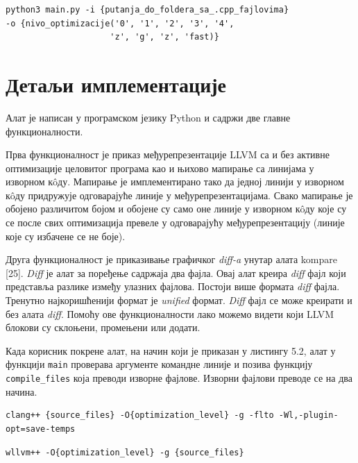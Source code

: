 \documentclass[12pt,oneside]{memoir}
\begin{document}
\begin{lstlisting}[frame=single,caption=Шаблон покретања алата,captionpos=b]
python3 main.py -i {putanja_do_foldera_sa_.cpp_fajlovima}
-o {nivo_optimizacije('0', '1', '2', '3', '4',
                     'z', 'g', 'z', 'fast)}

\end{lstlisting}

\section{Детаљи имплементације}

Алат је написан у програмском језику Python и садржи две главне функционалности.

Прва функционалност је приказ међурепрезентације LLVM са и без активне оптимизације
целовитог програма као и њихово мапирање са линијама у изворном к\^{o}ду.
Мапирање је имплементирано тако да једној линији у изворном к\^{o}ду придружује
одговарајуће линије у међурепрезентацијама.
Свако мапирање је обојено различитом бојом и обојене су само оне линије у изворном
к\^{o}ду које су се после свих оптимизација превеле у одговарајућу међурепрезентацију
 (линије које су избачене се не боје).

Друга функционалност је приказивање графичког \textit{diff-a} унутар алата kompare [25].
\textit{Diff} је алат за поређење садржаја два фајла.
Овај алат креира \textit{diff} фајл који представља разлике између улазних фајлова.
Постоји више формата \textit{diff} фајла. 
Тренутно најкоришћенији формат је \textit{unified} формат.
\textit{Diff} фајл се може креирати и без алата \textit{diff}.
Помоћу ове функционалности лако можемо видети који LLVM блокови су склоњени, 
промењени или додати.

Када корисник покрене алат, на начин који је приказан у листингу 5.2, алат у функцији
\texttt{main} проверава аргументе командне линије и позива функцију \texttt{compile{\_}files} која преводи изворне фајлове.
Изворни фајлови преводе се на два начина.

\begin{lstlisting}[frame=single, caption=Шаблон превођења изворних фајлова са оптимизацијом целовитог програма, captionpos=b]
clang++ {source_files} -O{optimization_level} -g -flto -Wl,-plugin-opt=save-temps
\end{lstlisting}
 
\begin{lstlisting}[frame=single, caption=Шаблон превођења изворних фајлова без оптимизације целовитог програма, captionpos=b]
wllvm++ -O{optimization_level} -g {source_files}
\end{lstlisting}
 
\end{document}
